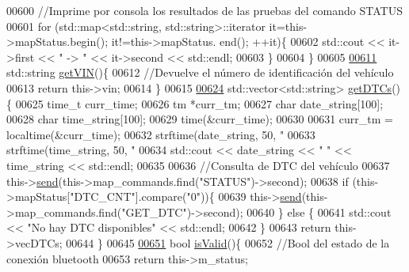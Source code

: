 \begin{DoxyCode}
{{{{{{{{{{{{{{00600         \textcolor{comment}{//Imprime por consola los resultados de las pruebas del comando STATUS}
00601         \textcolor{keywordflow}{for} (std::map<std::string, std::string>::iterator it=this->mapStatus.begin(); it!=this->mapStatus.
      end(); ++it)\{
00602             std::cout << it->first << \textcolor{stringliteral}{" -> "} << it->second << std::endl;
00603         \}
00604     \}
00605 
\hyperlink{classObd_ad88a0f25a7e3961726737915668ee13d}{00611}     std::string \hyperlink{classObd_ad88a0f25a7e3961726737915668ee13d}{getVIN}()\{
00612         \textcolor{comment}{//Devuelve el número de identificación del vehículo}
00613         \textcolor{keywordflow}{return} this->vin;
00614     \}
00615     
\hyperlink{classObd_ac57afb9228d933c6be5b2fa8e6446036}{00624}     std::vector<std::string> \hyperlink{classObd_ac57afb9228d933c6be5b2fa8e6446036}{getDTCs}()\{
00625         time\_t curr\_time;
00626         tm *curr\_tm;
00627         \textcolor{keywordtype}{char} date\_string[100];
00628         \textcolor{keywordtype}{char} time\_string[100];
00629         time(&curr\_time);
00630 
00631         curr\_tm = localtime(&curr\_time);
00632         strftime(date\_string, 50, \textcolor{stringliteral}{"%
00633         strftime(time\_string, 50, \textcolor{stringliteral}{"%
00634         std::cout << date\_string << \textcolor{stringliteral}{" "} << time\_string << std::endl;
00635 
00636         \textcolor{comment}{//Consulta de DTC del vehículo}
00637         this->\hyperlink{classObd_a453591bc9a280e8d44d82025ce8590e9}{send}(this->map\_commands.find(\textcolor{stringliteral}{"STATUS"})->second);
00638         \textcolor{keywordflow}{if} (this->mapStatus[\textcolor{stringliteral}{"DTC\_CNT"}].compare(\textcolor{stringliteral}{"0"}))\{
00639             this->\hyperlink{classObd_a453591bc9a280e8d44d82025ce8590e9}{send}(this->map\_commands.find(\textcolor{stringliteral}{"GET\_DTC"})->second);
00640         \} \textcolor{keywordflow}{else} \{
00641             std::cout << \textcolor{stringliteral}{"No hay DTC disponibles"} << std::endl;
00642         \}
00643         \textcolor{keywordflow}{return} this->vecDTCs;
00644     \}
00645 
\hyperlink{classObd_ae28b765bb787467f929eae932133d2aa}{00651}     \textcolor{keywordtype}{bool} \hyperlink{classObd_ae28b765bb787467f929eae932133d2aa}{isValid}()\{
00652         \textcolor{comment}{//Bool del estado de la conexión bluetooth}
00653         \textcolor{keywordflow}{return} this->m\_status;
}}}}}}}}}}}}}}}}
\end{DoxyCode}
